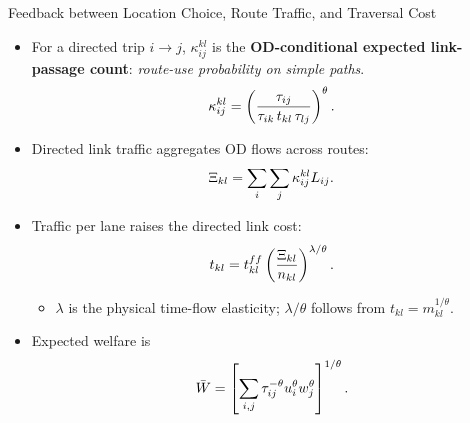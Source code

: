 \documentclass[11pt,aspectratio=169]{beamer}
\begin{document}
\begin{frame}{Feedback between Location Choice, Route Traffic, and Traversal Cost}
\begin{itemize}\footnotesize
  \item For a directed trip $i\to j$, $\kappa^{kl}_{ij}$ is the \textbf{OD-conditional expected link-passage count}: \textit{route-use probability on simple paths}.
  \vspace{-0.8em}\begin{equation}
    \kappa^{kl}_{ij}=\left(\frac{\tau_{ij}}{\tau_{ik}\,t_{kl}\,\tau_{lj}}\right)^\theta.
  \vspace{-0.6em}\end{equation}
  \item Directed link traffic aggregates OD flows across routes:
  \vspace{-0.5em}\begin{equation}\label{eq:Xi_c}
    \Xi_{kl}=\sum_i\sum_j\kappa^{kl}_{ij}L_{ij}.
  \vspace{-0.6em}\end{equation}
  \item Traffic per lane raises the directed link cost:
  \vspace{-0.5em}\begin{equation}\label{eq:c_Xi}
    t_{kl}=t_{kl}^{ff}\left(\frac{\Xi_{kl}}{n_{kl}}\right)^{\lambda/\theta}.
  \vspace{-0.6em}\end{equation}
  \begin{itemize}\scriptsize
    \item $\lambda$ is the physical time-flow elasticity; $\lambda/\theta$ follows from $t_{kl}=m_{kl}^{1/\theta}$.
  \end{itemize}
  \item Expected welfare is
  \vspace{-0.5em}\begin{equation}
    \bar W=\left[\sum_{i,j}\tau_{ij}^{-\theta}u_i^\theta w_j^\theta\right]^{1/\theta}.
  \vspace{-0.8em}\end{equation}
\end{itemize}
\end{frame}
\end{document}
